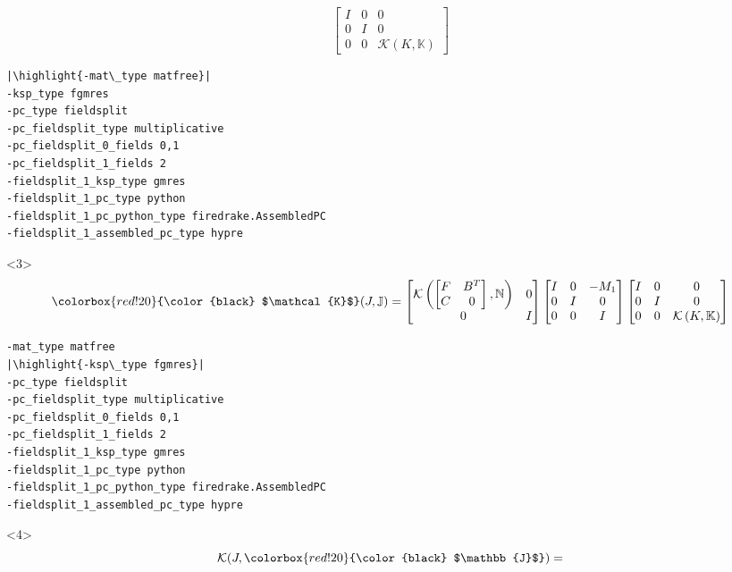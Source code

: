 \documentclass[presentation]{beamer}
\newcommand{\KSP}[2]{\ensuremath{\mathcal{K}\left(#1, \mathbb{#2}\right)}}
\newcommand{\ksp}[1]{\KSP{#1}{#1}}
\newcommand{\highlight}[1]{\colorbox{red!20}{\color{black} #1}}
\begin{document}
\begin{frame}[fragile]
\begin{onlyenv}
\begin{equation*}
\begin{bmatrix}
        I & 0 & 0\\
        0 & I & 0\\
        0 & 0 &\ksp{K}
      \end{bmatrix}
    \end{equation*}
\begin{verbatim}
|\highlight{-mat\_type matfree}|
-ksp_type fgmres
-pc_type fieldsplit
-pc_fieldsplit_type multiplicative
-pc_fieldsplit_0_fields 0,1
-pc_fieldsplit_1_fields 2
-fieldsplit_1_ksp_type gmres
-fieldsplit_1_pc_type python
-fieldsplit_1_pc_python_type firedrake.AssembledPC
-fieldsplit_1_assembled_pc_type hypre
\end{verbatim}
  \end{onlyenv}
  \begin{onlyenv}<3>
    \color{gray}
    \begin{equation*}
      \highlight{$\mathcal{K}$}(J, \mathbb{J}) =
      \begin{bmatrix}
        \KSP{\begin{bmatrix}
            F & B^T\\
            C & 0
          \end{bmatrix}}{N} & 0\\
        0 & I
      \end{bmatrix}
      \begin{bmatrix}
        I & 0 & -M_1\\
        0 & I & 0 \\
        0 & 0 & I
      \end{bmatrix}
      \begin{bmatrix}
        I & 0 & 0\\
        0 & I & 0\\
        0 & 0 &\ksp{K}
      \end{bmatrix}
    \end{equation*}
\begin{verbatim}
-mat_type matfree
|\highlight{-ksp\_type fgmres}|
-pc_type fieldsplit
-pc_fieldsplit_type multiplicative
-pc_fieldsplit_0_fields 0,1
-pc_fieldsplit_1_fields 2
-fieldsplit_1_ksp_type gmres
-fieldsplit_1_pc_type python
-fieldsplit_1_pc_python_type firedrake.AssembledPC
-fieldsplit_1_assembled_pc_type hypre
\end{verbatim}
  \end{onlyenv}
  \begin{onlyenv}<4>
    \color{gray}
    \begin{equation*}
      \mathcal{K}(J, \highlight{$\mathbb{J}$}) =

\end{equation*}
\end{onlyenv}
\end{frame}
\end{document}
